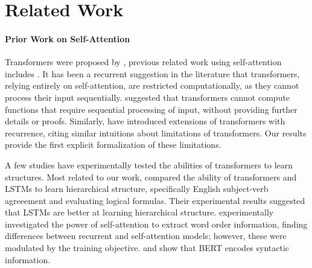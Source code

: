 \documentclass[11pt,a4paper]{article}
\begin{document}
\section{Related Work}\label{sec:related}
\paragraph{Prior Work on Self-Attention}
Transformers were proposed by \citet{vaswani2017attention}, previous related work using self-attention includes \citet{cheng2016long,parikh2016decomposable,paulus2017deep,lin2017structured}.
It has been a recurrent suggestion in the literature that transformers, relying entirely on self-attention, are restricted computationally, as they cannot process their input sequentially.
\citet{dehghani2018universal} suggested that %
transformers cannot compute functions that require sequential processing of input, without providing further details or proofs.
Similarly, \citet{shen2018disan,chen2018best,hao2019modeling} have introduced extensions of transformers with recurrence, citing similar intuitions about limitations of transformers.
Our results provide the first explicit formalization of these limitations.

A few studies have experimentally tested the abilities of transformers to learn structures.
Most related to our work, \citet{tran2018importance} compared the ability of transformers and LSTMs to learn hierarchical structure, specifically English subject-verb agreeement and evaluating logical formulas.
Their experimental results suggested that LSTMs are better at learning hierarchical structure.
\citet{yang2019assessing} experimentally investigated the power of self-attention to extract word order information, finding differences between recurrent and self-attention models; however, these were modulated by the training objective.
\citet{lin2019open} and \citet{tenney2019bert} show that BERT \cite{devlin2018bert} encodes syntactic information.
\end{document}

